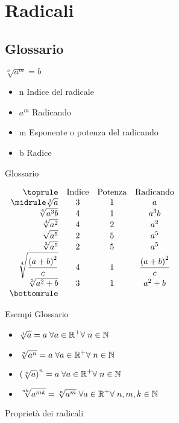 \chapter{Radicali}
\label{Radicaliradici}
\minitoc
\mtcskip                                %
\minilof                                %
\mtcskip                                %
\minilot
\section{Glossario}
\begin{table}[H]
\centering
$\sqrt[n]{a^m}=b$
\begin{itemize}
\item n Indice del radicale
\item $a^m$ Radicando
\item m Esponente o potenza del radicando
\item b Radice
\end{itemize}
\caption{Glossario}
\label{tab:RadicaliGlossario}
\end{table}
\begin{table}[H]
\centering
$
\begin{array}{rccc}
\toprule
 &\text{Indice} & \text{Potenza} & \text{Radicando} \\ 
 \midrule
 \sqrt[3]{a}& 3 &1  & a \\ 
 \sqrt[4]{a^3b}& 4 &1  & a^3b \\ 
 \sqrt[4]{a^2}& 4 &2  & a^2 \\
\sqrt{a^5}& 2 &5 & a^5 \\ 
\sqrt[2]{a^5}& 2 &5 & a^5 \\ 
\sqrt[4]{\dfrac{\left( a+b\right)^2 }{c}}& 4 &1 &\dfrac{\left( a+b\right)^2 }{c} \\
\sqrt[3]{a^2+b}& 3 &1 & a^2+b\\
\bottomrule	
\end{array}
$ 
\label{tab:esempiglossario}
\caption{Esempi Glossario}
\end{table}

\begin{table}[H]
\centering
\begin{itemize}
	\item $\sqrt[1]{a}=a\; \forall a\in\boldsymbol{\mathbb{R}}^{+}\forall\; n\in\boldsymbol{\mathbb{N}}$
	\item $\sqrt[n]{a^n}=a\; \forall a\in\boldsymbol{\mathbb{R}}^{+}\forall\; n\in\boldsymbol{\mathbb{N}} $
	\item $\left(\sqrt[n]{a}\right)^n=a\; \forall a\in\boldsymbol{\mathbb{R}}^{+}\forall\; n\in\boldsymbol{\mathbb{N}} $
	\item $\sqrt[nk]{a^{mk}}=\sqrt[n]{a^m}\;  \forall a\in\boldsymbol{\mathbb{R}}^{+}\forall\; n,m,k\in\boldsymbol{\mathbb{N}}$\label{Rad:invariantiva}
\end{itemize}
\label{tab:propRadicli}
\caption{Proprietà dei radicali}
\end{table}
